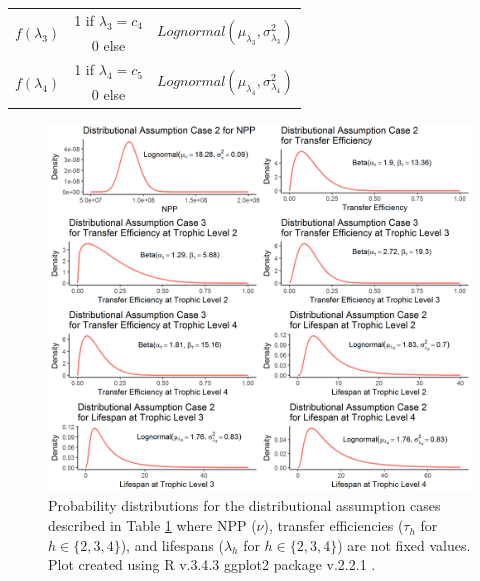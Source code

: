 \documentclass[oneside,12pt,final]{sty/ucthesis-CA2012}
\let\cite\citep                             %
\begin{document}
\begin{mainmatter}
\begin{table}[H]
\begin{tabular}{|c|c|c|c|}
   \hline      	
    \multirow{2}{*}{$f(\lambda_3)$} & 1 if $\lambda_3 = c_4$ & \multicolumn{2}{c|}{\multirow{2}{*}{$Lognormal(\mu_{\lambda_3}, \sigma_{\lambda_3}^2)$}} \\
    	& 0 else	& 	\multicolumn{2}{c|}{ }  \\
   \hline      	
    \multirow{2}{*}{$f(\lambda_4)$} & 1 if $\lambda_4 = c_5$ & \multicolumn{2}{c|}{\multirow{2}{*}{$Lognormal(\mu_{\lambda_4}, \sigma_{\lambda_4}^2)$}} \\
    	& 0 else	& 	\multicolumn{2}{c|}{ }  \\    	
   \hline
\end{tabular} 
\label{assumcases}
\end{table}

\begin{figure}[H]
     \centering
       \includegraphics[width=.9\textwidth]{fig/distassump}
    \caption{Probability distributions for the distributional assumption cases described in Table \ref{assumcases} where NPP ($\nu$), transfer efficiencies ($\tau_h$ for $h \in \{2, 3, 4\}$), and lifespans ($\lambda_h$ for $h \in \{2, 3, 4\}$) are not fixed values. Plot created using R v.3.4.3 \cite{Rcite} ggplot2 package v.2.2.1 \cite{ggplot}. }
    \label{distassump}
\end{figure}


\end{mainmatter}
\end{document}
